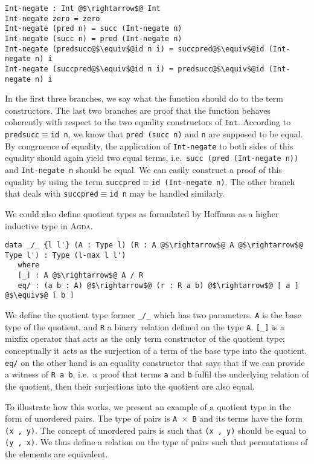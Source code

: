 \documentclass[12pt,twoside,maitrise]{dms}
\theoremstyle{definition}
\numberwithin{equation}{section}
\numberwithin{table}{chapter}
\numberwithin{figure}{chapter}
\newcommand\id[1] {\texttt{#1}}
\newcommand\fn[1] {\texttt{#1}}
\def\Agda{\textsc{Agda}\xspace}
\begin{document}
\begin{verbatim}
Int-negate : Int @$\rightarrow$@ Int
Int-negate zero = zero
Int-negate (pred n) = succ (Int-negate n)
Int-negate (succ n) = pred (Int-negate n)
Int-negate (predsucc@$\equiv$@id n i) = succpred@$\equiv$@id (Int-negate n) i
Int-negate (succpred@$\equiv$@id n i) = predsucc@$\equiv$@id (Int-negate n) i
\end{verbatim}

In the first three branches, we say what the function should do to the term
constructors. The last two branches are proof that the function behaves
coherently with respect to the two equality constructors of $\id{Int}$.
According to \fn{predsucc$\equiv$id n}, we know that \fn{pred (succ n)} and
\fn{n} are supposed to be equal. By congruence of equality, the application of
\id{Int-negate} to both sides of this equality should again yield two equal
terms, i.e.\ \fn{succ (pred (Int-negate n))} and \fn{Int-negate n} should be
equal. We can easily construct a proof of this equality by using the term
\fn{succpred$\equiv$id (Int-negate n)}. The other branch that deals with
\fn{succpred$\equiv$id n} may be handled similarly.

We could also define quotient types as formulated by
Hoffman\cite{hofmann1995extensional} as a higher inductive type in \Agda{}.

\begin{verbatim}
data _/_ {l l'} (A : Type l) (R : A @$\rightarrow$@ A @$\rightarrow$@ Type l') : Type (l-max l l')
   where
   [_] : A @$\rightarrow$@ A / R
   eq/ : (a b : A) @$\rightarrow$@ (r : R a b) @$\rightarrow$@ [ a ] @$\equiv$@ [ b ]
\end{verbatim}

We define the quotient type former \fn{\_/\_} which has two parameters. \id{A}
is the base type of the quotient, and \id{R} a binary relation defined on the
type \id{A}. \fn{[\_]} is a mixfix operator that acts as the only term
constructor of the quotient type; conceptually it acts as the surjection of a
term of the base type into the quotient. \fn{eq/} on the other hand is an
equality constructor that says that if we can provide a witness of \fn{R a b},
i.e.\ a proof that terms \id{a} and \id{b} fulfil the underlying relation of the
quotient, then their surjections into the quotient are also equal.

To illustrate how this works, we present an example of a quotient type in the
form of unordered pairs. The type of pairs is \fn{A $\times$ B} and its terms
have the form \fn{(x , y)}. The concept of unordered pairs is such that \fn{(x ,
  y)} should be equal to \fn{(y , x)}. We thus define a relation on the type of
pairs such that permutations of the elements are equivalent.
\end{document}
